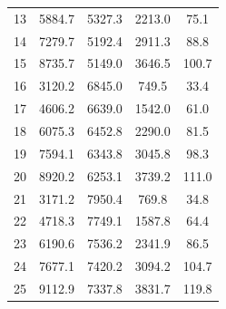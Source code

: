 \begin{longtable}{|c|c|c|c|c|}
    13           & 5884.7          & 5327.3              & 2213.0              & 75.1           \\
    14           & 7279.7          & 5192.4              & 2911.3              & 88.8           \\
    15           & 8735.7          & 5149.0              & 3646.5              & 100.7          \\ \hline
    16           & 3120.2          & 6845.0              & 749.5               & 33.4           \\
    17           & 4606.2          & 6639.0              & 1542.0              & 61.0           \\
    18           & 6075.3          & 6452.8              & 2290.0              & 81.5           \\
    19           & 7594.1          & 6343.8              & 3045.8              & 98.3           \\
    20           & 8920.2          & 6253.1              & 3739.2              & 111.0          \\ \hline
    21           & 3171.2          & 7950.4              & 769.8               & 34.8           \\
    22           & 4718.3          & 7749.1              & 1587.8              & 64.4           \\
    23           & 6190.6          & 7536.2              & 2341.9              & 86.5           \\
    24           & 7677.1          & 7420.2              & 3094.2              & 104.7          \\
    25           & 9112.9          & 7337.8              & 3831.7              & 119.8          \\ \hline
\end{longtable}

